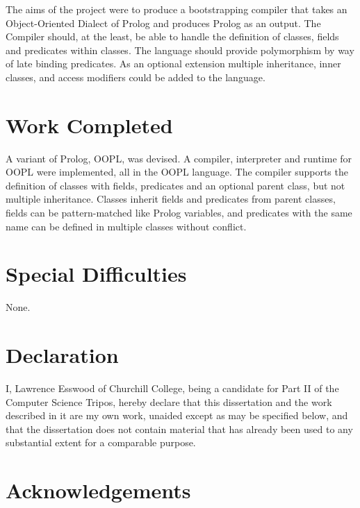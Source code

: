 \documentclass[12pt,a4paper,twoside,openright]{report}
\begin{document}
The aims of the project were to produce a bootstrapping compiler that takes an Object-Oriented Dialect of Prolog and produces Prolog as an output. The Compiler should, at the least, be able to handle the definition of classes, fields and predicates within classes. The language should provide polymorphism by way of late binding predicates. As an optional extension multiple inheritance, inner classes, and access modifiers could be added to the language.

\section*{Work Completed}

A variant of Prolog, OOPL, was devised. A compiler, interpreter and runtime for OOPL were implemented, all in the OOPL language. The compiler supports the definition of classes with fields, predicates and an optional parent class, but not multiple inheritance. Classes inherit fields and predicates from parent classes, fields can be pattern-matched like Prolog variables, and predicates with the same name can be defined in multiple classes without conflict.

\section*{Special Difficulties}

None.
 
\newpage
\section*{Declaration}

I, Lawrence Esswood of Churchill College, being a candidate for Part II of the Computer
Science Tripos, hereby declare that this dissertation and the work described in it are my own work,
unaided except as may be specified below, and that the dissertation
does not contain material that has already been used to any substantial
extent for a comparable purpose.

\bigskip
{}

\medskip
{}

\tableofcontents

\listoffigures

\newpage
\section*{Acknowledgements}
\end{document}
